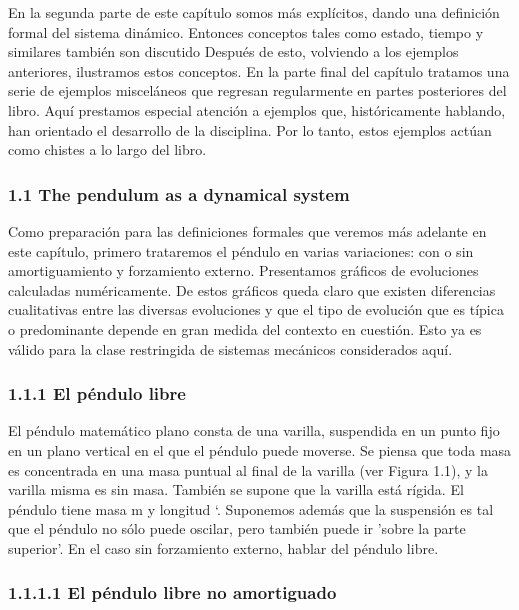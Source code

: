 \documentclass{beamer}
\begin{document}
\begin{frame}

En la segunda parte de este capítulo somos más explícitos, dando una definición formal
del sistema dinámico. Entonces conceptos tales como estado, tiempo y similares también son
discutido Después de esto, volviendo a los ejemplos anteriores, ilustramos estos conceptos.
En la parte final del capítulo tratamos una serie de ejemplos misceláneos que regresan regularmente en partes posteriores del libro. Aquí prestamos especial atención a
ejemplos que, históricamente hablando, han orientado el desarrollo de la
disciplina. Por lo tanto, estos ejemplos actúan como chistes a lo largo del libro.


\end{frame}

\begin{frame}\frametitle{1.1 The pendulum as a dynamical system}

Como preparación para las definiciones formales que veremos más adelante en este capítulo, primero trataremos el péndulo en varias variaciones: con o sin amortiguamiento y forzamiento externo. Presentamos gráficos de evoluciones calculadas numéricamente. De estos gráficos queda claro que existen diferencias cualitativas entre las diversas evoluciones y que el tipo de evolución que es típica o predominante depende en gran medida del contexto en cuestión. Esto ya es válido para la clase restringida de sistemas mecánicos considerados
aquí.


\end{frame}

\begin{frame}\frametitle{1.1.1 El péndulo libre}

El péndulo matemático plano consta de una varilla, suspendida en un punto fijo en
un plano vertical en el que el péndulo puede moverse. Se piensa que toda masa es
concentrada en una masa puntual al final de la varilla (ver Figura 1.1), y la varilla misma
es sin masa. También se supone que la varilla está rígida. El péndulo tiene masa m y longitud `.
Suponemos además que la suspensión es tal que el péndulo no sólo puede
oscilar, pero también puede ir 'sobre la parte superior'. En el caso sin forzamiento externo,
hablar del péndulo libre.

\end{frame}\frametitle{1.1.1.1 El péndulo libre no amortiguado}
\end{document}
